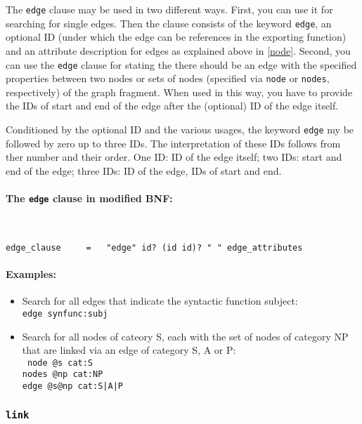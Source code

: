 \documentclass[12pt]{scrartcl}
\begin{document}
The \texttt{edge} clause may be used in two different ways.
First, you can use it for searching for single edges.
Then the clause consists of the keyword \texttt{edge}, an optional ID (under which the edge can be references in the exporting function) and an attribute description for edges as explained above in \ref{node}.
Second, you can use the \texttt{edge} clause for stating the there should be an edge with the specified properties between two nodes or sets of nodes (specified via \texttt{node} or \texttt{nodes}, respectively) of the graph fragment.
When used in this way, you have to provide the IDs of start and end of the edge after the (optional) ID of the edge itself.

Conditioned by the optional ID and the various usages, the keyword \texttt{edge} my be followed by zero up to three IDs.
The interpretation of these IDs follows from ther number and their order.
One ID: ID of the edge itself; two IDs: start and end of the edge; three IDs: ID of the edge, IDs of start and end.


\paragraph*{The \texttt{edge} clause in modified BNF:}
~
\begin{framed}
\begin{lstlisting}
edge_clause     =   "edge" id? (id id)? " " edge_attributes
\end{lstlisting}
\end{framed}


\paragraph*{Examples:}
\begin{itemize}
	\item Search for all edges that indicate the syntactic function subject:\\
	{\tt edge synfunc:subj}
	\item Search for all nodes of cateory S, each with the set of nodes of category NP that are linked via an edge of category S, A or P:\\
	{\tt
	node  @s    cat:S\\[-.4ex]
	nodes @np   cat:NP\\[-.4ex]
	edge  @s@np cat:S|A|P
	}
\end{itemize}



\subsubsection{\texttt{link}}\label{link}
\end{document}
